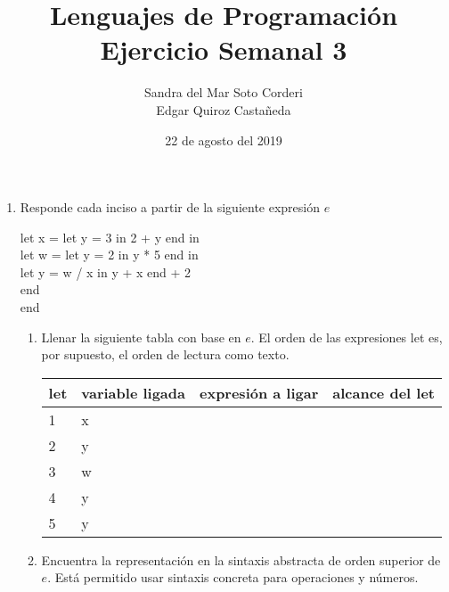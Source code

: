 \documentclass{article}
\begin{document}
    \title{
        Lenguajes de Programación \\
        Ejercicio Semanal 3
    }

    \author{
        Sandra del Mar Soto Corderi \\
        Edgar Quiroz Castañeda
    }

    \date{
        22 de agosto del 2019
    }
    
    \maketitle

    \begin{enumerate}
        \item {
            Responde cada inciso a partir de la siguiente expresión $e$
            
            let x = let y = 3 in 2 + y end in\\
            let w = let y = 2 in y * 5 end in\\
            let y = w / x in y + x end + 2\\
            end\\
            end
            
            \begin{enumerate}
            	\item { Llenar la siguiente tabla con base en $e$. El orden de las expresiones let es, por supuesto, el orden de lectura
            		como texto.
            		
            		\begin{table}[H]
            			\centering
            			\begin{tabular}{|l|l|l|l|}
            				\hline
            				let & variable ligada & expresión a ligar & alcance del let \\ \hline
            				1   & x               &                   &                 \\ \hline
            				2   & y               &                   &                 \\ \hline
            				3   & w               &                   &                 \\ \hline
            				4   & y               &                   &                 \\ \hline
            				5   & y               &                   &                 \\ \hline
            			\end{tabular}
            		\end{table}
            	}
            \item {
            Encuentra la representación en la sintaxis abstracta de orden superior de $e$. Está permitido usar sintaxis concreta para operaciones y números.\\
        	
}
\end{enumerate}}
\end{enumerate}
\end{document}
